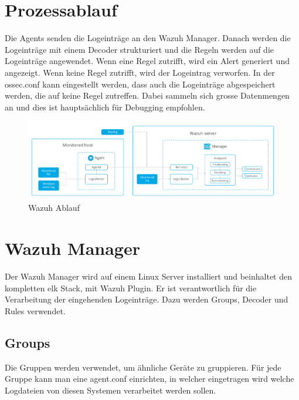 \section{Prozessablauf}
Die Agents senden die Logeinträge an den Wazuh Manager.
Danach werden die Logeinträge mit einem Decoder strukturiert und die Regeln werden auf die Logeinträge angewendet.
Wenn eine Regel zutrifft, wird ein Alert generiert und angezeigt.
Wenn keine Regel zutrifft, wird der Logeintrag verworfen.
In der ossec.conf kann eingestellt werden, dass auch die Logeinträge abgespeichert werden, die auf keine Regel zutreffen.
Dabei sammeln sich grosse Datenmengen an und dies ist hauptsächlich für Debugging empfohlen.

\begin{figure}[H]
    \centering
    \includegraphics[width=\linewidth]{../img/wazuh-ablauf.png}
    \caption[Wazuh Ablauf]{Wazuh Ablauf\footnotemark}
\end{figure}

\section{Wazuh Manager}
Der Wazuh Manager wird auf einem Linux Server installiert und beinhaltet den kompletten \acrshort{elk} Stack, mit Wazuh Plugin. 
Er ist verantwortlich für die Verarbeitung der eingehenden Logeinträge. 
Dazu werden Groups, Decoder und Rules verwendet. 

\subsection{Groups}
Die Gruppen werden verwendet, um ähnliche Geräte zu gruppieren.
Für jede Gruppe kann man eine agent.conf einrichten, in welcher eingetragen wird welche Logdateien von diesen Systemen verarbeitet werden sollen. 

